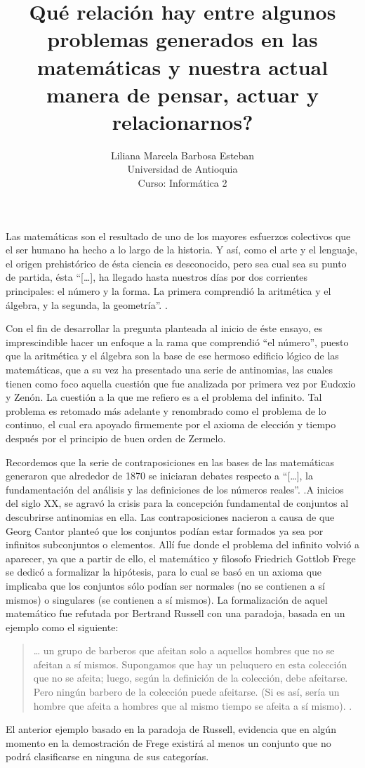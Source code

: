 \documentclass[letterpaper, 12 pt, conference]{ieeeconf}  %
\title{\LARGE \bf
\textquestiondown Qu\'{e} relaci\'{o}n hay entre algunos problemas generados en las matem\'{a}ticas y nuestra actual manera de pensar, actuar y relacionarnos?
}
\author{Liliana Marcela Barbosa Esteban\\%
Universidad de Antioquia \\
Curso: Inform\'{a}tica 2
}
\begin{document}
\maketitle
\thispagestyle{empty}
\pagestyle{empty}


\begin{.}
Las matemáticas son el resultado de uno de los mayores esfuerzos colectivos que el ser humano ha hecho a lo largo de la historia. Y así, como el arte y el lenguaje, el origen prehistórico de ésta ciencia es desconocido, pero sea cual sea su punto de partida, ésta “[…], ha llegado hasta nuestros días por dos corrientes principales: el número y la forma. La primera comprendió la aritmética y el álgebra, y la segunda, la geometría”. \cite{c9}.
\smallskip

Con el fin de desarrollar la pregunta planteada al inicio de éste ensayo, es imprescindible hacer un enfoque a la rama que comprendió “el número”, puesto que la aritmética y el álgebra son la base de ese hermoso edificio lógico de las matemáticas, que a su vez ha presentado una serie de antinomias, las cuales tienen como foco aquella cuestión que fue analizada por primera vez por Eudoxio y Zenón. La cuestión a la que me refiero es a el problema del infinito. Tal problema es retomado más adelante y renombrado como el problema de lo continuo, el cual era apoyado firmemente por el axioma de elección y tiempo después por el principio de buen orden de Zermelo.
\smallskip

Recordemos que la serie de contraposiciones en las bases de las matemáticas generaron que alrededor de 1870 se iniciaran debates respecto a “[…], la fundamentación del análisis y las definiciones de los números reales”. \cite{c18}.A inicios del siglo XX, se agravó la crisis para la concepción fundamental de conjuntos al descubrirse antinomias en ella. Las contraposiciones nacieron a causa de que Georg Cantor planteó que los conjuntos podían estar formados ya sea por infinitos subconjuntos o elementos. Allí fue donde el problema del infinito volvió a aparecer, ya que a partir de ello, el matemático y filosofo Friedrich Gottlob Frege se dedicó a formalizar la hipótesis, para lo cual se basó en un axioma que implicaba que los conjuntos sólo podían ser normales (no se contienen a sí mismos) o singulares (se contienen a sí mismos). La formalización de aquel matemático fue refutada por Bertrand Russell con una paradoja, basada en un ejemplo como el siguiente: 
\smallskip
\begin{quote}
… un grupo de barberos que afeitan solo a aquellos hombres que no se afeitan a sí mismos. Supongamos que hay un peluquero en esta colección que no se afeita; luego, según la definición de la colección, debe afeitarse. Pero ningún barbero de la colección puede afeitarse. (Si es así, sería un hombre que afeita a hombres que al mismo tiempo se afeita a sí mismo). \cite{c11}. 
\end{quote}
\smallskip
El anterior ejemplo basado en la paradoja de Russell, evidencia que en algún momento en la demostración de Frege existirá al menos un conjunto que no podrá clasificarse en ninguna de sus categorías.
\smallskip


\end{.}
\end{document}
